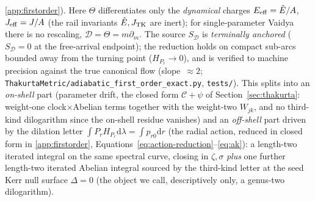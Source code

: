 \documentclass[12pt]{iopart}
\theoremstyle{plain}
\theoremstyle{definition}
\theoremstyle{remark}
\newcommand{\Ehat}{\hat E}
\newcommand{\dd}{\mathrm{d}}
\begin{document}
\ref{app:firstorder}). Here $\Theta$ differentiates only the \emph{dynamical}
charges $E_{\rm eff}=\Ehat/A$, $J_{\rm eff}=J/A$ (the rail invariants $\Ehat,J_{\rm TK}$
are inert); for single-parameter Vaidya there is no rescaling, $\mathcal D=\Theta=m\partial_m$.
The source $S_{\mathcal D}$ is \emph{terminally anchored} ($S_{\mathcal D}=0$ at the
free-arrival endpoint); the reduction holds on compact sub-arcs bounded away from the
turning point ($H_{P_r}\to0$), and is verified to machine precision against the true
canonical flow (slope~$\approx2$;
\texttt{ThakurtaMetric/adiabatic\_first\_order\_exact.py}, \texttt{tests/}). This splits
into an \emph{on-shell} part (parameter drift, the closed form $\mathcal C+\psi$ of
Section~\ref{sec:thakurta}: weight-one clock$\times$Abelian terms together with the
weight-two $W_{jk}$, and no third-kind dilogarithm since the on-shell residue vanishes)
and an \emph{off-shell}
part driven by the dilation letter $\int P_r H_{P_r}\dd\lambda=\int p_{r0}\dd r$ (the
radial action, reduced in closed form in \ref{app:firstorder},
Equations~\eqref{eq:action-reduction}--\eqref{eq:ak}): a length-two iterated integral on the
same spectral curve, closing in $\zeta,\sigma$ \emph{plus} one further length-two
iterated Abelian integral sourced by the third-kind letter at the seed Kerr null
surface $\Delta=0$ (the object we call, descriptively only, a genus-two
dilogarithm).
\end{document}
